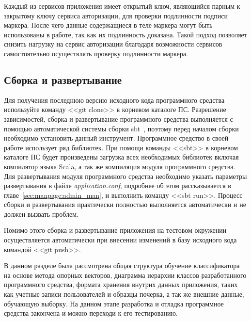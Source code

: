 Каждый из сервисов приложения имеет открытый ключ, являющийся парным к закрытому ключу сервиса авторизации, для проверки подлинности подписи маркера. После чего данные содержащиеся в теле маркера могут быть использованы в работе, так как их подлинность доказана. Такой подход позволяет снизить нагрузку на сервис авторизации благодаря возможности сервисов самостоятельно осуществлять проверку подлинности маркера.

\subsection{Сборка и развертывание}
Для получения последнюю версию исходного кода программного средства используйте команду <<git clone>> в корневом каталоге ПС. Разрешение зависимостей, сборка и развертывание программного средства выполняется с помощью автоматической системы сборки sbt~\cite{sbt}, поэтому перед началом сборки необходимо установить данный инструмент. Программное средство в своей работе использует ряд библиотек. При помощи команды <<sbt>> в корневом каталоге ПС будет произведены загрузка всех необходимых библиотек включая компилятор языка Scala, а так же компиляция модуля программного средства.
Для развертывания модуля программного средства необходимо указать параметры развертывания в файле \emph{application.conf}, подробнее об этом рассказывается в главе~\ref{sec:manpage:admin_man}, и выполнить команду <<sbt run>>. Процесс сборки и развертывания практически полностью выполняется автоматически и не должен вызвать проблем.

Помимо этого сборка и развертывание приложения на тестовом окружении осуществляется автоматически при внесении изменений в базу исходного кода командой <<git push>>.

В данном разделе была рассмотрена общая структура обучение классификатора на основе метода опорных векторов, диаграмма иерархии классов разработанного программного средства, формата хранения внутрих данных приложения, таких как учетные записи пользователей и образцы почерка, а так же внешние данные, обучающую выборку. На данном этапе разработка и отладка программное средства закончена и можно переходи к его тестированию.